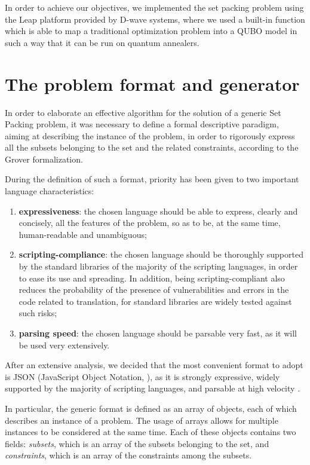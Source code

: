 \documentclass[oneside,a4paper]{article}
\begin{document}
In order to achieve our objectives, we implemented the set packing problem using the Leap platform provided by D-wave systems, where we used a built-in function which is able to map a traditional optimization problem into a QUBO model in such a way that it can be run on quantum annealers.

\section{The problem format and generator}
In order to elaborate an effective algorithm for the solution of a generic Set Packing problem, it was necessary to define a formal descriptive paradigm, aiming at describing the instance of the problem, in order to rigorously express all the subsets belonging to the set and the related constraints, according to the Grover formalization. 

During the definition of such a format, priority has been given to two important language characteristics:
\begin{enumerate}
    \item \textbf{expressiveness}: the chosen language should be able to express, clearly and concisely, all the features of the problem, so as to be, at the same time, human-readable and unambiguous;
    \item \textbf{scripting-compliance}: the chosen language should be thoroughly supported by the standard libraries of the majority of the scripting languages, in order to ease its use and spreading. In addition, being scripting-compliant also reduces the probability of the presence of vulnerabilities and errors in the code related to translation, for standard libraries are widely tested against such risks;
    \item \textbf{parsing speed}: the chosen language should be parsable very fast, as it will be used very extensively.
\end{enumerate}
After an extensive analysis, we decided that the most convenient format to adopt is JSON (JavaScript Object Notation, \cite{WebSite9}), as it is strongly expressive, widely supported by the majority of scripting languages, and parsable at high velocity \cite{WebSite7}.

In particular, the generic format is defined as an array of objects, each of which describes an instance of a problem. The usage of arrays allows for multiple instances to be considered at the same time. Each of these objects contains two fields: \textit{subsets}, which is an array of the subsets belonging to the set, and \textit{constraints}, which is an array of the constraints among the subsets. 
\end{document}
